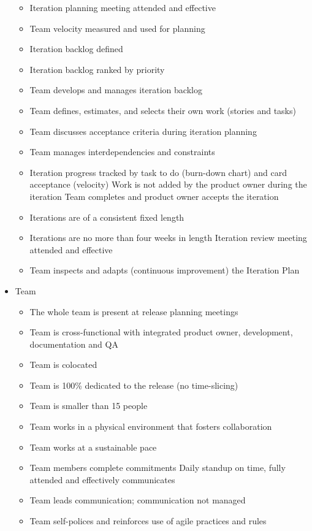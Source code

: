 \begin{appendices}
\begin{itemize}
\begin{itemize}
			\item Iteration planning meeting attended and effective
			\item Team velocity measured and used for planning %
			\item Iteration backlog defined
			\item Iteration backlog ranked by priority
			\item Team develops and manages iteration backlog
			\item Team defines, estimates, and selects their own work (stories and tasks)
			\item Team discusses acceptance criteria during iteration planning
			\item Team manages interdependencies and constraints
			\item Iteration progress tracked by task to do (burn-down chart) and card acceptance (velocity)
			\removed Work is not added by the product owner during the iteration
			\removed Team completes and product owner accepts the iteration 
			\item Iterations are of a consistent fixed length
			\item Iterations are no more than four weeks in length
			\removed Iteration review meeting attended and effective
			\item Team inspects and adapts (continuous improvement) the Iteration Plan
		\end{itemize}
	\item Team
		\begin{itemize}
			\item The whole team is present at release planning meetings
			\item Team is cross-functional with integrated product owner, development, documentation and QA
			\item Team is colocated
			\item Team is 100\% dedicated to the release (no time-slicing)
			\item Team is smaller than 15 people
			\item Team works in a physical environment that fosters collaboration
			\item Team works at a sustainable pace %
			\item Team members complete commitments
			\removed Daily standup on time, fully attended and effectively communicates
			\item Team leads communication; communication not managed
			\item Team self-polices and reinforces use of agile practices and rules

\end{itemize}
\end{itemize}
\end{appendices}
